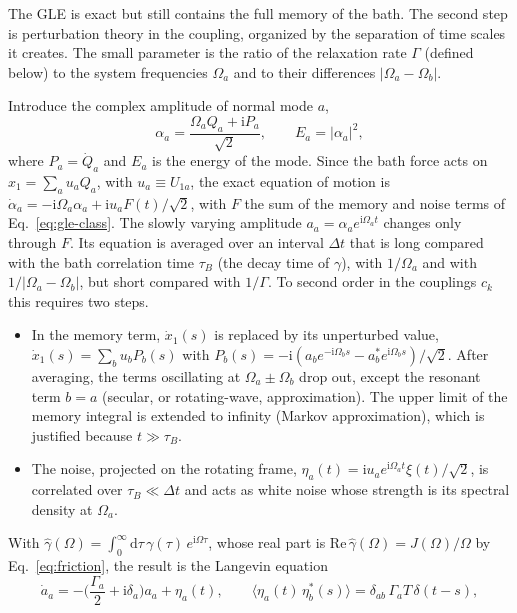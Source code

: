 \documentclass[10pt,a4paper]{article}
\newcommand{\dd}{\mathrm{d}}
\newcommand{\ii}{\mathrm{i}}
\begin{document}
The GLE is exact but still contains the full memory of the bath.
The second step is perturbation theory in the coupling, organized by the separation of time scales it creates.
The small parameter is the ratio of the relaxation rate $ \Gamma $ (defined below) to the system frequencies $ \Omega_a $ and to their differences $ |\Omega_a - \Omega_b| $.

Introduce the complex amplitude of normal mode $ a $,
\begin{equation}
  \alpha_a = \frac{\Omega_a Q_a + \ii P_a}{\sqrt 2} ,
  \qquad
  E_a = |\alpha_a|^2 ,
  \label{eq:amplitude}
\end{equation}
where $ P_a = \dot Q_a $ and $ E_a $ is the energy of the mode.
Since the bath force acts on $ x_1 = \sum_a u_a Q_a $, with $ u_a \equiv U_{1a} $, the exact equation of motion is $ \dot\alpha_a = -\ii\Omega_a \alpha_a + \ii u_a F(t)/\sqrt 2 $, with $ F $ the sum of the memory and noise terms of Eq.~\eqref{eq:gle-class}.
The slowly varying amplitude $ a_a = \alpha_a e^{\ii\Omega_a t} $ changes only through $ F $.
Its equation is averaged over an interval $ \Delta t $ that is long compared with the bath correlation time $ \tau_B $ (the decay time of $ \gamma $), with $ 1/\Omega_a $ and with $ 1/|\Omega_a - \Omega_b| $, but short compared with $ 1/\Gamma $.
To second order in the couplings $ c_k $ this requires two steps.
\begin{itemize}[leftmargin=1.5em]
\item In the memory term, $ \dot x_1(s) $ is replaced by its unperturbed value, $ \dot x_1(s) = \sum_b u_b P_b(s) $ with $ P_b(s) = -\ii(a_b e^{-\ii\Omega_b s} - a_b^* e^{\ii\Omega_b s})/\sqrt 2 $. After averaging, the terms oscillating at $ \Omega_a \pm \Omega_b $ drop out, except the resonant term $ b = a $ (secular, or rotating-wave, approximation). The upper limit of the memory integral is extended to infinity (Markov approximation), which is justified because $ t \gg \tau_B $.
\item The noise, projected on the rotating frame, $ \eta_a(t) = \ii u_a e^{\ii\Omega_a t} \xi(t)/\sqrt 2 $, is correlated over $ \tau_B \ll \Delta t $ and acts as white noise whose strength is its spectral density at $ \Omega_a $.
\end{itemize}
With $ \hat\gamma(\Omega) = \int_0^\infty \dd\tau \, \gamma(\tau) \, e^{\ii\Omega\tau} $, whose real part is $ \mathrm{Re}\,\hat\gamma(\Omega) = J(\Omega)/\Omega $ by Eq.~\eqref{eq:friction}, the result is the Langevin equation
\begin{equation}
  \dot a_a = -\Big( \frac{\Gamma_a}{2} + \ii\delta_a \Big) a_a + \eta_a(t) ,
  \qquad
  \langle \eta_a(t) \, \eta_b^*(s) \rangle = \delta_{ab} \, \Gamma_a T \, \delta(t-s) ,
  \label{eq:langevin-amp}
\end{equation}
\end{document}
